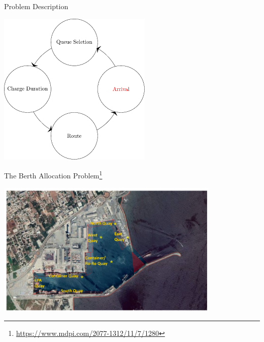 \documentclass[aspectratio=169]{beamer}
\begin{document}
\begin{frame}[label={sec:org265762a}]{Problem Description}
\begin{center}
\includegraphics[width=0.55\textwidth]{./img/visit.pdf}
\end{center}
\end{frame}

\begin{frame}[label={sec:org6648da9}]{The Berth Allocation Problem\footnote{\url{https://www.mdpi.com/2077-1312/11/7/1280}}}
\begin{center}
\includegraphics[width=0.8\textwidth]{./img/berthing-sky-picture.png}
\end{center}
\end{frame}
\end{document}
